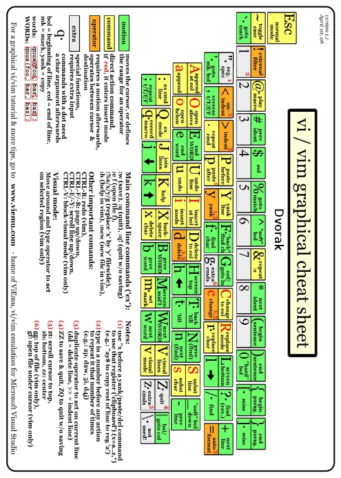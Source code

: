 \documentclass{article}
\begin{document}
\begin{center}
    \includegraphics[width=0.95\textwidth]{vim-cheat-sheet}
\end{center}


\end{document}
